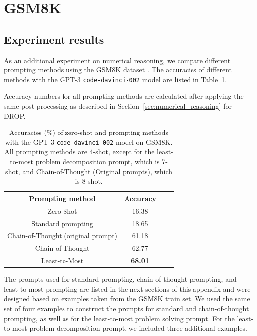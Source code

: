 \section{GSM8K}
\label{app:gsm8k}

\subsection{Experiment results}

As an additional experiment on numerical reasoning, we compare different prompting methods using the GSM8K dataset \citep{cobbe2021training}.
The accuracies of different methods with the GPT-3 \texttt{code-davinci-002} model are listed in Table~\ref{table: gsm8k-results}.

Accuracy numbers for all prompting methods are calculated after applying the same post-processing as described in Section~\ref{sec:numerical_reasoning} for DROP.

\begin{table}[h!]
\centering
\begin{tabular}{ |c|c|c|c|}
\hline
\textbf{Prompting method} & \textbf{Accuracy}  \\
  \hline
Zero-Shot & 16.38 \\
\hline
Standard prompting & 18.65 \\
\hline
Chain-of-Thought (original prompt) & 61.18 \\
\hline
Chain-of-Thought & 62.77 \\
\hline
Least-to-Most & \textbf{68.01} \\
\hline\end{tabular}
\vspace{5pt}
\caption{Accuracies (\%) of zero-shot and prompting methods with the GPT-3 \texttt{code-davinci-002} model on GSM8K. All prompting methods are 4-shot, except for the least-to-most problem decomposition prompt, which is 7-shot, and Chain-of-Thought (Original prompts), which is 8-shot.}
\label{table: gsm8k-results}
\end{table}

The prompts used for standard prompting, chain-of-thought prompting, and least-to-most prompting are listed in the next sections of this appendix and were designed based on examples taken from the GSM8K train set. We used the same set of four examples to construct the prompts for standard and chain-of-thought prompting, as well as for the least-to-most problem solving prompt. For the least-to-most problem decomposition prompt, we included three additional examples.


